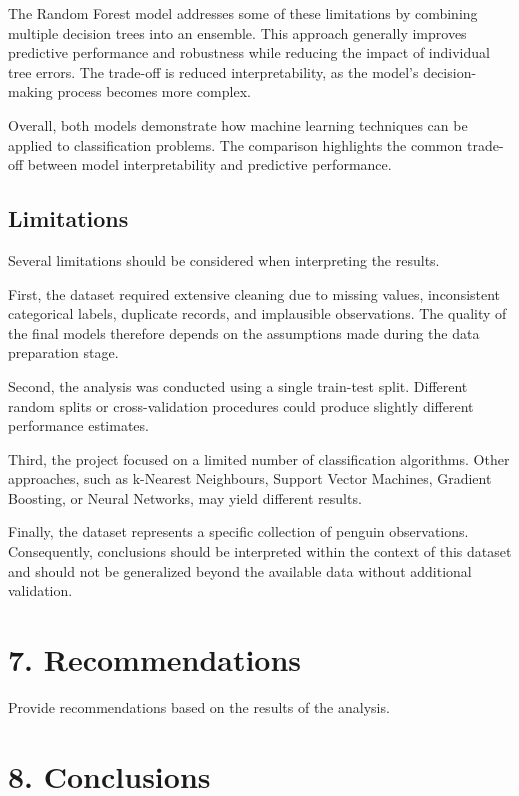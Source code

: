 \documentclass[
]{article}
\begin{document}
The Random Forest model addresses some of these limitations by combining
multiple decision trees into an ensemble. This approach generally
improves predictive performance and robustness while reducing the impact
of individual tree errors. The trade-off is reduced interpretability, as
the model's decision-making process becomes more complex.

Overall, both models demonstrate how machine learning techniques can be
applied to classification problems. The comparison highlights the common
trade-off between model interpretability and predictive performance.

\subsection{Limitations}\label{limitations}

Several limitations should be considered when interpreting the results.

First, the dataset required extensive cleaning due to missing values,
inconsistent categorical labels, duplicate records, and implausible
observations. The quality of the final models therefore depends on the
assumptions made during the data preparation stage.

Second, the analysis was conducted using a single train-test split.
Different random splits or cross-validation procedures could produce
slightly different performance estimates.

Third, the project focused on a limited number of classification
algorithms. Other approaches, such as k-Nearest Neighbours, Support
Vector Machines, Gradient Boosting, or Neural Networks, may yield
different results.

Finally, the dataset represents a specific collection of penguin
observations. Consequently, conclusions should be interpreted within the
context of this dataset and should not be generalized beyond the
available data without additional validation.

\section{7. Recommendations}\label{recommendations}

Provide recommendations based on the results of the analysis.

\section{8. Conclusions}\label{conclusions}
\end{document}
